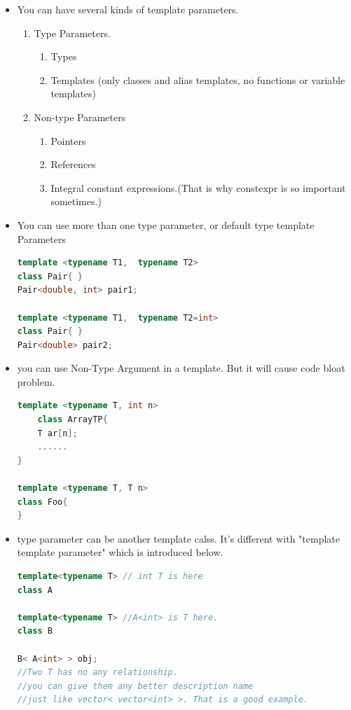 \documentclass[a4paper,11pt,twoside]{book}
\begin{document}
\begin{itemize}
\item You can have several kinds of template parameters.
\begin{enumerate}
\item  Type Parameters.
  	\begin{enumerate}
   	\item Types
    \item  Templates (only classes and alias templates, no functions or variable templates)
	\end{enumerate}

\item Non-type Parameters
   \begin{enumerate}
	\item Pointers
	\item References
	\item Integral constant expressions.(That is why constexpr is so important sometimes.)
	\end{enumerate}
\end{enumerate}

\item You can use more than one type parameter, or default type template Parameters
\begin{lstlisting}[frame=single, language=c++]
template <typename T1,  typename T2>
class Pair{ }
Pair<double, int> pair1;

template <typename T1,  typename T2=int>
class Pair{ }
Pair<double> pair2;
\end{lstlisting}

\item you can use Non-Type Argument in a template. But it will cause code bloat problem. 
\begin{lstlisting}[frame=single, language=c++]
template <typename T, int n>
	class ArrayTP{
	T ar[n];
	......
}

template <typename T, T n>
class Foo{
}
\end{lstlisting}

\item type parameter can be another template calss.  It's different with "template template parameter" which is introduced below.
\begin{lstlisting}[frame=single, language=c++]
template<typename T> // int T is here
class A

template<typename T> //A<int> is T here.
class B

B< A<int> > obj;
//Two T has no any relationship.
//you can give them any better description name
//just like vector< vector<int> >. That is a good example.
\end{lstlisting}


\end{itemize}
\end{document}
